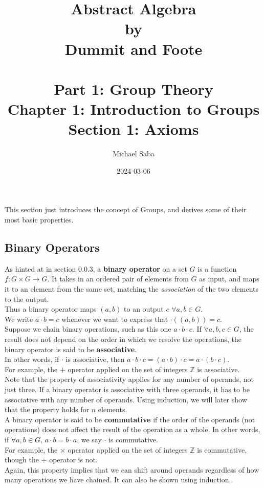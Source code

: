 \documentclass[12pt]{article}
\title{%
    \Huge Abstract Algebra \\
    \large by \\
    \Large Dummit and Foote \\~\\
    \huge Part 1: Group Theory \\
    \LARGE Chapter 1: Introduction to Groups \\
    \Large Section 1: Axioms
}
\date{2024-03-06}
\author{Michael Saba}
\newcommand{\Z}{\mathbb{Z}}
\begin{document}
    \maketitle
    \newpage

    This section just introduces the concept of Groups,
    and derives some of their most basic properties. \\

    \subsection*{Binary Operators}
    
    As hinted at in section 0.0.3,
    a \textbf{binary operator} on a set $G$ is a function
    $f: G \times G \rightarrow G$.
    It takes in an ordered pair of elements from $G$ as input,
    and maps it to an element from the same set,
    matching the \textit{association} of the two elements to the output. \\
    Thus a binary operator maps $(a, b)$
    to an output $c$ $\forall a, b \in G$. \\
    We write $a \cdot b = c$ whenever we want to express that 
    $\cdot((a, b)) = c$. \\

    Suppose we chain binary operations,
    such as this one $a \cdot b \cdot c$.
    If $\forall a, b, c \in G$,
    the result does not depend on the order
    in which we resolve the operations,
    the binary operator is said to be \textbf{associative}. \\
    In other words, if $\cdot$ is associative,
    then
    $a \cdot b \cdot c = (a \cdot b) \cdot c = a \cdot (b \cdot c)$. \\
    For example,
    the $+$ operator applied on the set of integers $\Z$
    is associative. \\
    Note that the property of associativity
    applies for any number of operands,
    not just three.
    If a binary operator is associative with three operands,
    it has to be associative with any number of operands.
    Using induction,
    we will later show that the property holds for $n$ elements. \\

    A binary operator is said to be \textbf{commutative}
    if the order of the operands (not operations) does not affect
    the result of the operation as a whole.
    In other words, if $\forall a, b \in G$,
    $a \cdot b = b \cdot a$,
    we say $\cdot$ is commutative. \\
    For example,
    the $\times$ operator applied on the set of integers $\Z$
    is commutative,
    though the $\div$ operator is not. \\
    Again, this property implies that we can shift around operands
    regardless of how many operations we have chained.
    It can also be shown using induction. \\
\end{document}
